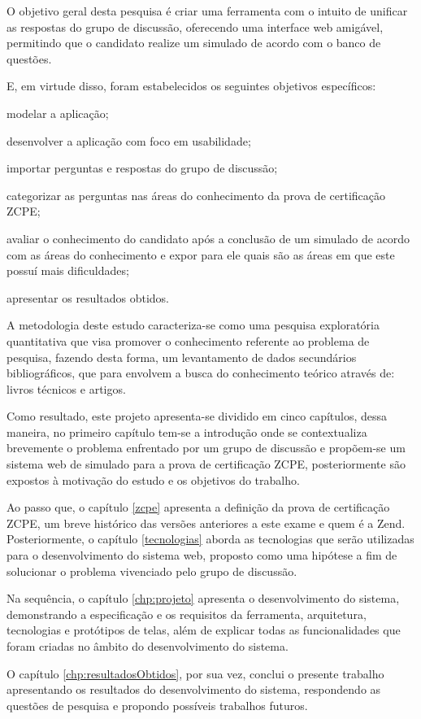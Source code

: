 
O objetivo geral desta pesquisa é criar uma ferramenta com o intuito de
unificar as respostas do grupo de discussão, oferecendo uma interface web
amigável, permitindo que o candidato realize um simulado de
acordo com o banco de questões.


E, em virtude disso, foram estabelecidos os seguintes objetivos
específicos:

\begin{alineas}
    \item modelar a aplicação;
    \item desenvolver a aplicação com foco em usabilidade;
    \item importar perguntas e respostas do grupo de discussão;
    \item categorizar as perguntas nas áreas do conhecimento da prova de
    certificação \acs{ZCPE};
    \item avaliar o conhecimento do candidato após a conclusão de um simulado
    de acordo com as áreas do conhecimento e expor para ele quais são as áreas  em
    que este possuí mais dificuldades;
    \item apresentar os resultados obtidos.
\end{alineas}


A metodologia deste estudo caracteriza-se como uma pesquisa exploratória
quantitativa que visa promover o conhecimento referente ao problema de pesquisa,
fazendo desta forma, um levantamento de dados secundários bibliográficos, que para
 envolvem a busca do conhecimento
teórico através de: livros técnicos e artigos.

Como resultado, este projeto apresenta-se dividido em cinco capítulos, dessa
maneira, no primeiro capítulo tem-se a introdução onde se contextualiza 
brevemente o problema enfrentado por um grupo de discussão e propõem-se um 
sistema web de simulado para a prova de certificação \acs{ZCPE}, 
posteriormente são expostos à motivação do estudo e os objetivos do trabalho.

Ao passo que, o capítulo \ref{zcpe} apresenta a definição da prova de
certificação \acl{ZCPE}, um breve histórico das versões anteriores a este
exame e quem é a \acs{Zend}. Posteriormente, o capítulo \ref{tecnologias} aborda
as tecnologias que serão utilizadas para o desenvolvimento do sistema web, 
proposto como uma hipótese a fim de solucionar o problema vivenciado pelo grupo 
de discussão.

Na sequência, o capítulo \ref{chp:projeto} apresenta o desenvolvimento do
sistema, demonstrando a especificação e os requisitos da ferramenta,
arquitetura, tecnologias e protótipos de telas, além de explicar todas as funcionalidades
que foram criadas no âmbito do desenvolvimento do sistema.

O capítulo \ref{chp:resultadosObtidos}, por sua vez, conclui o presente trabalho
apresentando os resultados do desenvolvimento do sistema, respondendo as
questões de pesquisa e propondo possíveis trabalhos futuros.
